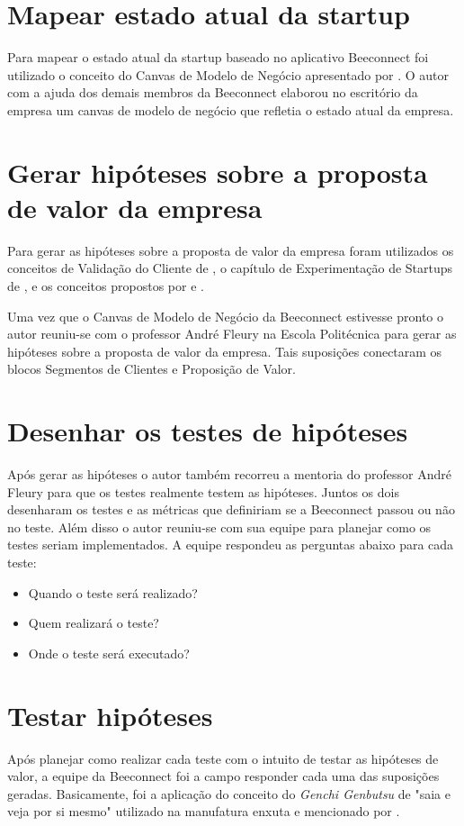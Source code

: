 \section{Mapear estado atual da startup}
\label{cha:mapear_estado}
Para mapear o estado atual da startup baseado no aplicativo Beeconnect foi utilizado o conceito do Canvas de Modelo de Negócio apresentado por .
O autor com a ajuda dos demais membros da Beeconnect elaborou no escritório da empresa um canvas de modelo de negócio que refletia o estado atual da empresa. 

\section{Gerar hipóteses sobre a proposta de valor da empresa}
\label{cha:gerar_hipoteses}
Para gerar as hipóteses sobre a proposta de valor da empresa foram utilizados os conceitos de Validação do Cliente de , o capítulo de Experimentação de Startups de , e os conceitos propostos por  e .    

Uma vez que o Canvas de Modelo de Negócio da Beeconnect estivesse pronto o autor reuniu-se com o professor André Fleury na Escola Politécnica para gerar as hipóteses sobre a proposta de valor da empresa. Tais suposições conectaram os blocos Segmentos de Clientes e Proposição de Valor.

\section{Desenhar os testes de hipóteses}
\label{cha:desenhar_hipoteses}
Após gerar as hipóteses o autor também recorreu a mentoria do professor André Fleury para que os testes realmente testem as hipóteses. Juntos os dois desenharam os testes e as métricas que definiriam se a Beeconnect passou ou não no teste. 
Além disso o autor reuniu-se com sua equipe para planejar como os testes seriam implementados. A equipe respondeu as perguntas abaixo para cada teste:
\begin{itemize}
\item Quando o teste será realizado?
\item Quem realizará o teste?
\item Onde o teste será executado?
\end{itemize}

\section{Testar hipóteses}
\label{cha:testar_hipoteses}
Após planejar como realizar cada teste com o intuito de testar as hipóteses de valor, a equipe da Beeconnect foi a campo responder cada uma das suposições geradas. Basicamente, foi a aplicação do conceito do \textit{Genchi Genbutsu} de "saia e veja por si mesmo" utilizado na manufatura enxuta e mencionado por .

